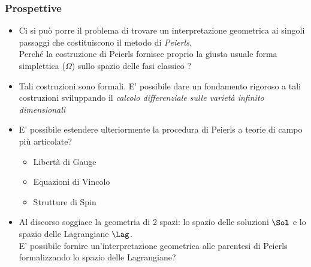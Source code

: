 \documentclass[8pt,handout]{beamer}
\begin{document}
	\begin{frame}
		\frametitle{ Prospettive}
			\begin{itemize}
				\item Ci si può porre il problema di trovare un interpretazione geometrica ai singoli passaggi che costituiscono il metodo di \emph{Peierls}.\\
				 Perché la costruzione di Peierls fornisce proprio la giusta usuale forma simplettica ($\Omega$) sullo spazio delle fasi classico ?
				\item Tali costruzioni sono formali. E' possibile dare un fondamento rigoroso a tali costruzioni sviluppando il \emph{calcolo differenziale sulle varietà infinito dimensionali} 
				\item E' possibile estendere ulteriormente la procedura di Peierls a teorie di campo più articolate?
					\begin{itemize}
						\item Libertà di Gauge
						\item Equazioni di Vincolo
						\item Strutture di Spin
					\end{itemize}
				\item Al discorso soggiace la geometria di 2 spazi: lo spazio delle soluzioni $\Sol$ e lo spazio delle Lagrangiane $\Lag$.\\
					E' possibile fornire un'interpretazione geometrica alle parentesi di Peierls formalizzando lo spazio delle Lagrangiane?
			\end{itemize}
	\end{frame}	
	
\end{document}
